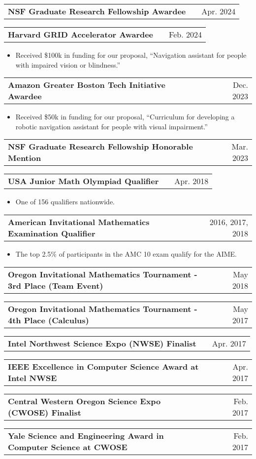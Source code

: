 \documentclass[a4paper,12pt]{article}
\makeatletter
\newenvironment{jobshort}[2]
    {
    \begin{tabularx}{\linewidth}{@{}l X r@{}}
    \textbf{#1} & \hfill &  #2 \\[3.75pt]
    \end{tabularx}
    }
    {
    }
\newenvironment{joblong}[2]
    {
    \begin{tabularx}{\linewidth}{@{}l X r@{}}
    \textbf{#1} & \hfill &  #2 \\[3.75pt]
    \end{tabularx}
    \begin{minipage}[t]{\linewidth}
    \begin{itemize}[nosep,after=\strut, leftmargin=2em, itemsep=3pt,label=--]
    }
    {
    \end{itemize}
    \end{minipage}    
    }
\makeatother
\begin{document}
\begin{adjustwidth}{0.7em}{0pt}
\begin{jobshort}{NSF Graduate Research Fellowship Awardee}{Apr. 2024}
\end{jobshort}
\begin{joblong}{Harvard GRID Accelerator Awardee}{Feb. 2024}
    \item Received \$100k in funding for our proposal, “Navigation assistant for people with impaired vision or blindness.” 
\end{joblong}
\begin{joblong}{Amazon Greater Boston Tech Initiative Awardee}{Dec. 2023}
    \item Received \$50k in funding for our proposal, “Curriculum for developing a robotic navigation assistant for people with visual impairment.” 
\end{joblong}
\begin{jobshort}{NSF Graduate Research Fellowship Honorable Mention}{Mar. 2023}
\end{jobshort}
\begin{joblong}{USA Junior Math Olympiad Qualifier}{Apr. 2018}
    \item One of 156 qualifiers nationwide.
\end{joblong}
\begin{joblong}{American Invitational Mathematics Examination Qualifier}{2016, 2017, 2018}
    \item The top 2.5\% of participants in the AMC 10 exam qualify for the AIME.
\end{joblong}
\begin{jobshort}{Oregon Invitational Mathematics Tournament - 3rd Place (Team Event)}{May 2018}
\end{jobshort}
\begin{jobshort}{Oregon Invitational Mathematics Tournament - 4th Place (Calculus)}{May 2017}
\end{jobshort}
\begin{jobshort}{Intel Northwest Science Expo (NWSE) Finalist}{Apr. 2017}
\end{jobshort}
\begin{jobshort}{IEEE Excellence in Computer Science Award at Intel NWSE}{Apr. 2017}
\end{jobshort}
\begin{jobshort}{Central Western Oregon Science Expo (CWOSE) Finalist}{Feb. 2017}
\end{jobshort}
\begin{jobshort}{Yale Science and Engineering Award in Computer Science at CWOSE}{Feb. 2017}
\end{jobshort}
\end{adjustwidth}
\end{document}

